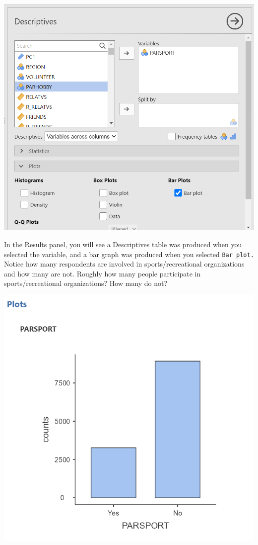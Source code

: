 \documentclass[
]{book}
\begin{document}
\includegraphics{img/PARSPORTBarGraphCommands.png}

In the Results panel, you will see a Descriptives table was produced when you selected the variable, and a bar graph was produced when you selected \texttt{Bar\ plot.} Notice how many respondents are involved in sports/recreational organizations and how many are not. Roughly how many people participate in sports/recreational organizations? How many do not?

\includegraphics{img/PARSPORTBarGraph.png}
\end{document}
